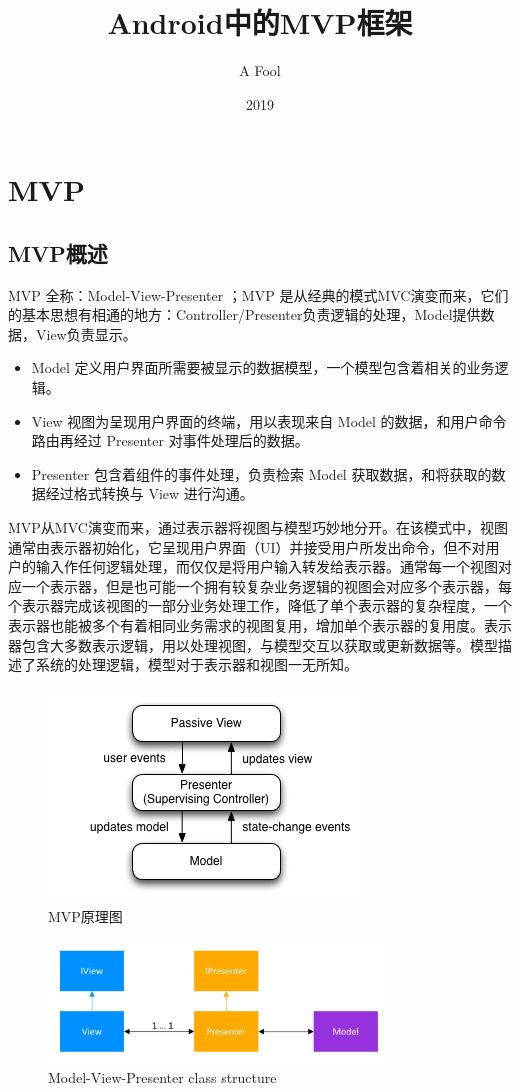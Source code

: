 \documentclass[a4paper,12pt]{ctexart}
\title{Android中的MVP框架}
\author{A Fool}
\date{2019}
\begin{document}
	\maketitle
	\tableofcontents
	\section{MVP}
	\subsection{MVP概述}
	MVP 全称：Model-View-Presenter ；MVP 是从经典的模式MVC演变而来，它们的基本思想有相通的地方：Controller/Presenter负责逻辑的处理，Model提供数据，View负责显示。
	\begin{itemize}
		\item Model 定义用户界面所需要被显示的数据模型，一个模型包含着相关的业务逻辑。
		\item View 视图为呈现用户界面的终端，用以表现来自 Model 的数据，和用户命令路由再经过 Presenter 对事件处理后的数据。
		\item Presenter 包含着组件的事件处理，负责检索 Model 获取数据，和将获取的数据经过格式转换与 View 进行沟通。
	\end{itemize}
	\par MVP从MVC演变而来，通过表示器将视图与模型巧妙地分开。在该模式中，视图通常由表示器初始化，它呈现用户界面（UI）并接受用户所发出命令，但不对用户的输入作任何逻辑处理，而仅仅是将用户输入转发给表示器。通常每一个视图对应一个表示器，但是也可能一个拥有较复杂业务逻辑的视图会对应多个表示器，每个表示器完成该视图的一部分业务处理工作，降低了单个表示器的复杂程度，一个表示器也能被多个有着相同业务需求的视图复用，增加单个表示器的复用度。表示器包含大多数表示逻辑，用以处理视图，与模型交互以获取或更新数据等。模型描述了系统的处理逻辑，模型对于表示器和视图一无所知。
	\begin{figure}[!h]
		\centering
		\includegraphics[]{image/1.png}
		\caption{MVP原理图}
	\end{figure}
	\begin{figure}[!h]
		\centering
		\includegraphics[width=0.8\textwidth]{image/2.png}
		\caption{Model-View-Presenter class structure}
	\end{figure}
\end{document}
